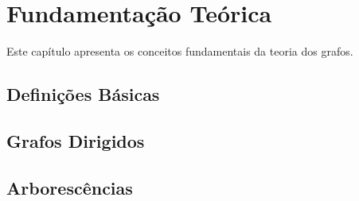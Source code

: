 \chapter{Fundamentação Teórica}
\label{cap:fundamentacao}

Este capítulo apresenta os conceitos fundamentais da teoria dos grafos.

\section{Definições Básicas}

\section{Grafos Dirigidos}

\section{Arborescências}
